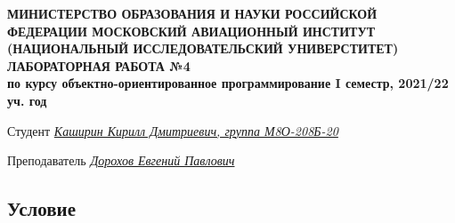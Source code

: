 \documentclass[12pt]{article}
\begin{document}
\begin{titlepage}
\begin{center}
\textbf{МИНИСТЕРСТВО ОБРАЗОВАНИЯ И НАУКИ РОССИЙСКОЙ ФЕДЕРАЦИИ
\medskip
МОСКОВСКИЙ АВИАЦИОННЫЙ ИНСТИТУТ
(НАЦИОНАЛЬНЫЙ ИССЛЕДОВАТЕЛЬСКИЙ УНИВЕРСТИТЕТ)
\vfill\vfill
{\Huge ЛАБОРАТОРНАЯ РАБОТА №4} \\
по курсу объектно-ориентированное программирование
I семестр, 2021/22 уч. год}
\end{center}
\vfill

Студент \uline{\it {Каширин Кирилл Дмитриевич, группа М8О-208Б-20}\hfill}

Преподаватель \uline{\it {Дорохов Евгений Павлович}\hfill}

\vfill
\end{titlepage}

\subsection*{Условие}
\end{document}
